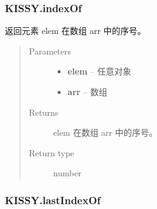 \documentclass[letterpaper,10pt,english]{sphinxmanual}
\begin{document}
\subsubsection{KISSY.indexOf}
\label{api/seed/lang/indexOf:kissy-indexof}\label{api/seed/lang/indexOf::doc}

\begin{fulllineitems}
\label{api/seed/lang/indexOf:Lang.KISSY.indexOf}
返回元素 elem 在数组 arr 中的序号。
\begin{quote}\begin{description}
\item[{Parameters}] \leavevmode\begin{itemize}
\item {}
\textbf{elem} -- 任意对象

\item {}
\textbf{arr} -- 数组

\end{itemize}

\item[{Returns}] \leavevmode
elem 在数组 arr 中的序号。

\item[{Return type}] \leavevmode
number

\end{description}\end{quote}

\end{fulllineitems}



\subsubsection{KISSY.lastIndexOf}
\label{api/seed/lang/lastIndexOf::doc}\label{api/seed/lang/lastIndexOf:kissy-lastindexof}
\end{document}
